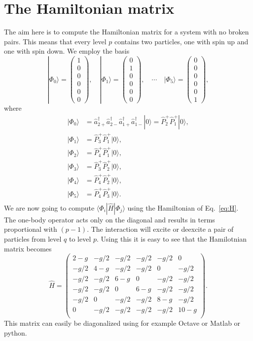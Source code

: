 \documentclass[a4paper,11pt,twoside]{article}
\newcommand{\bra}[1]{\langle #1 |}
\newcommand{\ket}[1]{| #1 \rangle}
\begin{document}
\section{The Hamiltonian matrix}
The aim here is to compute the Hamiltonian matrix for a system with no broken pairs. This means that every level $p$ contains
two particles, one with spin up and one with spin down. We employ the basis
\[ \ket{\Phi_0} = \begin{pmatrix} 1 \\ 0 \\ 0 \\ 0 \\ 0 \\ 0 \end{pmatrix}, \quad
\ket{\Phi_1} = \begin{pmatrix} 0 \\ 1 \\ 0 \\ 0 \\ 0 \\ 0 \end{pmatrix}, \quad \cdots \quad
\ket{\Phi_5} = \begin{pmatrix} 0 \\ 0 \\ 0 \\ 0 \\ 0 \\ 1 \end{pmatrix}, \]
%
where
\begin{align*}
\ket{\Phi_0} &= \hat a_{2+}^\dagger \hat a_{2-}^\dagger \hat a_{1+}^\dagger \hat a_{1-}^\dagger \ket{0} = \hat P_2^+ \hat P_1^+ \ket{0}, \\
%
\ket{\Phi_1} &= \hat P_3^+ \hat P_1^+ \ket{0}, \\
%
\ket{\Phi_2} &= \hat P_4^+ \hat P_1^+ \ket{0}, \\
%
\ket{\Phi_3} &= \hat P_3^+ \hat P_2^+ \ket{0}, \\
%
\ket{\Phi_4} &= \hat P_4^+ \hat P_2^+ \ket{0}, \\
%
\ket{\Phi_5} &= \hat P_4^+ \hat P_3^+ \ket{0}. \\
\end{align*}
%
We are now going to compute $\bra{\Phi_i} \hat H \ket{\Phi_j}$ using the Hamiltonian of Eq.~\eqref{eq:H}. 
The one-body operator acts only on the diagonal and results in terms proportional with $(p-1)$. The interaction
will excite or deexcite a pair of particles from level $q$ to level $p$. Using this it is easy to see that the Hamilotnian matrix becomes
\[ \hat H = \begin{pmatrix}
2 - g & -g/2 & -g/2 & -g/2 & -g/2 & 0 \\
-g/2 & 4- g & -g/2 & -g/2 & 0 & -g/2 \\
-g/2 & -g/2 & 6 -g & 0 & -g/2 & -g/2 \\
-g/2 & -g/2 & 0 & 6 -g & -g/2 & -g/2 \\
-g/2 & 0 & -g/2 & -g/2 & 8 - g & -g/2 \\
0 & -g/2 & -g/2 & -g/2 & -g/2 & 10 - g \\
\end{pmatrix} . \]
%
This matrix can easily be diagonalized using for example Octave or Matlab or python. 
 
\end{document}
